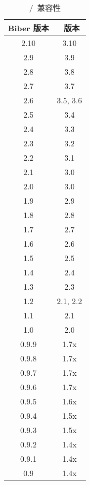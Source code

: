 \begin{table}
	\tablesetup\centering
	\begin{tabular}{cc}
		\toprule
		\sffamily\bfseries\spotcolor Biber 版本
		& \sffamily\bfseries\spotcolor \biblatex\ 版本\\
		\midrule
                2.10 & 3.10\\
		2.9 & 3.9\\
		2.8 & 3.8\\
		2.7 & 3.7\\
		2.6 & 3.5, 3.6\\
		2.5 & 3.4\\
		2.4 & 3.3\\
		2.3 & 3.2\\
		2.2 & 3.1\\
		2.1 & 3.0\\
		2.0 & 3.0\\
		1.9 & 2.9\\
		1.8 & 2.8\\
		1.7 & 2.7\\
		1.6 & 2.6\\
		1.5 & 2.5\\
		1.4 & 2.4\\
		1.3 & 2.3\\
		1.2 & 2.1, 2.2\\
		1.1 & 2.1\\
		1.0 & 2.0\\
		0.9.9 & 1.7x\\
		0.9.8 & 1.7x\\
		0.9.7 & 1.7x\\
		0.9.6 & 1.7x\\
		0.9.5 & 1.6x\\
		0.9.4 & 1.5x\\
		0.9.3 & 1.5x\\
		0.9.2 & 1.4x\\
		0.9.1 & 1.4x\\
		0.9 & 1.4x\\
		\bottomrule
	\end{tabular}
	\caption{\biber/\biblatex\ 兼容性}
	\label{tab:int:pre:bibercompat}
\end{table}
